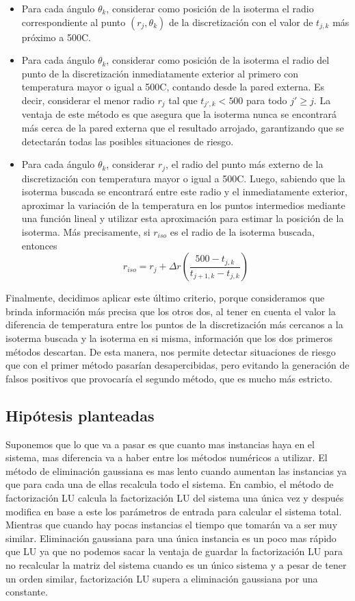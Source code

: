 \documentclass[11pt, a4paper, spanish]{article}
\theoremstyle{plain}
\theoremstyle{remark}
\begin{document}
    \begin{itemize}
      \item Para cada ángulo $\theta_k$, considerar como posición de la isoterma el radio correspondiente al punto $(r_j, \theta_k)$ de la discretización con el valor de $t_{j,k}$ más próximo a 500{\degree}C.
      \item Para cada ángulo $\theta_k$, considerar como posición de la isoterma el radio del punto de la discretización inmediatamente exterior al primero con temperatura mayor o igual a 500{\degree}C, contando desde la pared externa. Es decir, considerar el menor radio $r_j$ tal que $t_{j',k} < 500$ para todo $j' \geq j$. La ventaja de este método es que asegura que la isoterma nunca se encontrará más cerca de la pared externa que el resultado arrojado, garantizando que se detectarán todas las posibles situaciones de riesgo.
      \item Para cada ángulo $\theta_k$, considerar $r_j$, el radio del punto más externo de la discretización con temperatura mayor o igual a 500{\degree}C. Luego, sabiendo que la isoterma buscada se encontrará entre este radio y el inmediatamente exterior, aproximar la variación de la temperatura en los puntos intermedios mediante una función lineal y utilizar esta aproximación para estimar la posición de la isoterma. Más precisamente, si $r_{iso}$ es el radio de la isoterma buscada, entonces
        \[ r_{iso} = r_j + \Delta r \left(\frac{500 - t_{j,k}}{t_{j+1,k} - t_{j,k}} \right) \]
    \end{itemize}

    Finalmente, decidimos aplicar este último criterio, porque consideramos que brinda información más precisa que los otros dos, al tener en cuenta el valor la diferencia de temperatura entre los puntos de la discretización más cercanos a la isoterma buscada y la isoterma en si misma, información que los dos primeros métodos descartan. De esta manera, nos permite detectar situaciones de riesgo que con el primer método pasarían desapercibidas, pero evitando la generación de falsos positivos que provocaría el segundo método, que es mucho más estricto.

  \subsection{Hipótesis planteadas}

    Suponemos que lo que va a pasar es que cuanto mas instancias haya en el sistema, mas diferencia va a haber entre los métodos numéricos a utilizar. El método de eliminación gaussiana es mas lento cuando aumentan las instancias ya que para cada una de ellas recalcula todo el sistema. En cambio, el método de factorización LU calcula la factorización LU del sistema una única vez y después modifica en base a este los parámetros de entrada para calcular el sistema total. Mientras que cuando hay pocas instancias el tiempo que tomarán va a ser muy similar. Eliminación gaussiana para una única instancia es un poco mas rápido que LU ya que no podemos sacar la ventaja de guardar la factorización LU para no recalcular la matriz del sistema cuando es un único sistema y a pesar de tener un orden similar, factorización LU supera a eliminación gaussiana por una constante.
\end{document}
